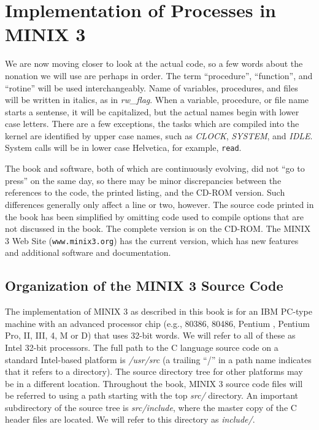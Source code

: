 \documentclass{book}
\newcommand {\www} [1] {\texttt{#1}}
\newcommand {\sys} [1] {\textsl{#1}}
\newcommand {\cmd} [1] {\texttt{#1}}
\begin{document}
\section{Implementation of Processes in MINIX 3}
We are now moving closer to look at the actual code,
so a few words about the nonation we will use are perhaps in order.
The term ``procedure'', ``function'', and ``rotine'' will be used interchangeably.
Name of variables, procedures, and files will be written in italics, as in \textit{rw\_flag}.
When a variable, procedure, or file name starts a sentense, it will be capitalized, but the actual names begin with lower case letters.
There are a few exceptions, the tasks which are compiled into the kernel are identified by upper case names, 
such as \sys{CLOCK}, \sys{SYSTEM}, and \sys{IDLE}.
System calls will be in lower case Helvetica, for example, \cmd{read}.

The book and software, both of which are continuously evolving, did not ``go to press'' on the same day, 
so there may be minor discrepancies between the references to the code, the printed listing, and the CD-ROM version.
Such differences generally only affect a line or two, however.
The source code printed in the book has been simplified by omitting code used to compile options that are not discussed in the book.
The complete version is on the CD-ROM.
The MINIX 3 Web Site (\www{www.minix3.org}) has the current version, which has new features and additional software and documentation.

\subsection{Organization of the MINIX 3 Source Code}
The implementation of MINIX 3 as described in this book is for an IBM PC-type machine with an advanced processor chip
(e.g., 80386, 80486, Pentium , Pentium Pro, II, III, 4, M or D) that uses 32-bit words.
We will refer to all of these as Intel 32-bit processors.
The full path to the C language source code on a standard Intel-based platform is \sys{/usr/src} 
(a trailing ``/'' in a path name indicates that it refers to a directory).
The source directory tree for other platforms may be in a different location.
Throughout the book, MINIX 3 source code files will be referred to using a path starting with the top \sys{src/} directory.
An important subdirectory of the source tree is \sys{src/include},
where the master copy of the C header files are located.
We will refer to this directory as \sys{include/}.
\end{document}
